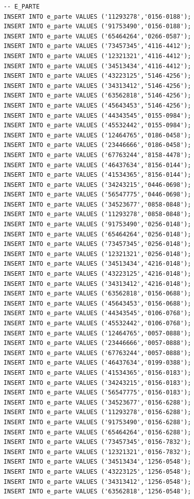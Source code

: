 \documentclass[12pt]{report}
\begin{document}
\begin{scriptsize}
\begin{verbatim}
-- E_PARTE
INSERT INTO e_parte VALUES ('11293278','0156-0188');
INSERT INTO e_parte VALUES ('91753490','0156-0188');
INSERT INTO e_parte VALUES ('65464264','0266-0587');
INSERT INTO e_parte VALUES ('73457345','4116-4412');
INSERT INTO e_parte VALUES ('12321321','4116-4412');
INSERT INTO e_parte VALUES ('34513434','4116-4412');
INSERT INTO e_parte VALUES ('43223125','5146-4256');
INSERT INTO e_parte VALUES ('34313412','5146-4256');
INSERT INTO e_parte VALUES ('63562818','5146-4256');
INSERT INTO e_parte VALUES ('45643453','5146-4256');
INSERT INTO e_parte VALUES ('44343545','0155-0984');
INSERT INTO e_parte VALUES ('45532442','0155-0984');
INSERT INTO e_parte VALUES ('12464765','0186-0458');
INSERT INTO e_parte VALUES ('23446666','0186-0458');
INSERT INTO e_parte VALUES ('67763244','8158-4478');
INSERT INTO e_parte VALUES ('46437634','8156-0144');
INSERT INTO e_parte VALUES ('41534365','8156-0144');
INSERT INTO e_parte VALUES ('34243215','0446-0698');
INSERT INTO e_parte VALUES ('56547775','0446-0698');
INSERT INTO e_parte VALUES ('34523677','0858-0848');
INSERT INTO e_parte VALUES ('11293278','0858-0848');
INSERT INTO e_parte VALUES ('91753490','0256-0148');
INSERT INTO e_parte VALUES ('65464264','0256-0148');
INSERT INTO e_parte VALUES ('73457345','0256-0148');
INSERT INTO e_parte VALUES ('12321321','0256-0148');
INSERT INTO e_parte VALUES ('34513434','4216-0148');
INSERT INTO e_parte VALUES ('43223125','4216-0148');
INSERT INTO e_parte VALUES ('34313412','4216-0148');
INSERT INTO e_parte VALUES ('63562818','0156-0688');
INSERT INTO e_parte VALUES ('45643453','0156-0688');
INSERT INTO e_parte VALUES ('44343545','0106-0768');
INSERT INTO e_parte VALUES ('45532442','0106-0768');
INSERT INTO e_parte VALUES ('12464765','0057-0888');
INSERT INTO e_parte VALUES ('23446666','0057-0888');
INSERT INTO e_parte VALUES ('67763244','0057-0888');
INSERT INTO e_parte VALUES ('46437634','0199-0388');
INSERT INTO e_parte VALUES ('41534365','0156-0183');
INSERT INTO e_parte VALUES ('34243215','0156-0183');
INSERT INTO e_parte VALUES ('56547775','0156-0183');
INSERT INTO e_parte VALUES ('34523677','0156-6288');
INSERT INTO e_parte VALUES ('11293278','0156-6288');
INSERT INTO e_parte VALUES ('91753490','0156-6288');
INSERT INTO e_parte VALUES ('65464264','0156-6288');
INSERT INTO e_parte VALUES ('73457345','0156-7832');
INSERT INTO e_parte VALUES ('12321321','0156-7832');
INSERT INTO e_parte VALUES ('34513434','1256-0548');
INSERT INTO e_parte VALUES ('43223125','1256-0548');
INSERT INTO e_parte VALUES ('34313412','1256-0548');
INSERT INTO e_parte VALUES ('63562818','1256-0548');

\end{verbatim}
\end{scriptsize}
\end{document}
